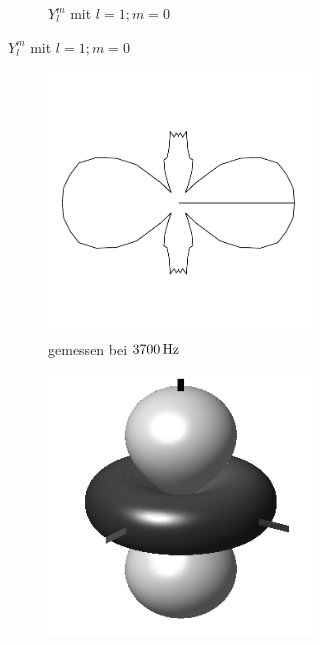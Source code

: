 \documentclass[numbers=noenddot,12pt,a4paper]{scrartcl}
\begin{document}
\begin{figure}[H]
\begin{subfigure}[h]{0.3\textwidth}
\begin{subfigure}[b]{\textwidth}
			\caption{$Y_l^m$ mit $l=1;m=0$} \label{img:l1y}
		\end{subfigure}
	\end{subfigure}
	\begin{subfigure}[h]{0.3\textwidth}
		\begin{subfigure}[b]{\textwidth}
			\includegraphics[angle=90,origin=c,width=\textwidth]{messwerte/polarl2.pdf}
			\caption{gemessen bei $\unit[3700]{Hz}$} \label{img:l2}
		\end{subfigure}
		\begin{subfigure}[b]{\textwidth}
			\includegraphics[width=\textwidth]{Spherical_Harmonics_deg3l2m0.png}

\end{subfigure}
\end{subfigure}
\end{figure}
\end{document}
